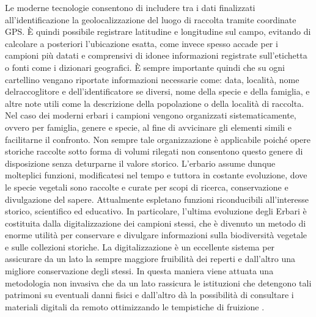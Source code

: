 \documentclass[main.tex]{subfiles}
\begin{document}
Le moderne tecnologie consentono di includere tra i dati finalizzati all’identificazione la geolocalizzazione del luogo di raccolta tramite coordinate GPS. È quindi possibile registrare latitudine e longitudine sul campo, evitando di calcolare a posteriori l’ubicazione esatta, come invece spesso accade per i campioni più datati e comprensivi di idonee informazioni registrate sull'etichetta o fonti come i dizionari geografici. È sempre importante quindi che su ogni cartellino vengano riportate informazioni necessarie come: data, località, nome delraccoglitore e dell’identificatore se diversi, nome della specie e della famiglia, e altre note utili come la descrizione della popolazione o della località di raccolta.
Nel caso dei moderni erbari i campioni vengono organizzati sistematicamente, ovvero per famiglia, genere e specie, al fine di avvicinare gli elementi simili e facilitarne il confronto. Non sempre tale organizzazione è applicabile poiché opere storiche raccolte sotto forma di volumi rilegati non consentono questo genere di disposizione senza deturparne il valore storico.
L’erbario assume dunque molteplici funzioni, modificatesi nel tempo e tuttora in costante evoluzione, dove le specie vegetali sono raccolte e curate per scopi di ricerca, conservazione e divulgazione del sapere. Attualmente espletano funzioni riconducibili all’interesse storico, scientifico ed educativo.
In particolare, l’ultima evoluzione degli Erbari è costituita dalla digitalizzazione dei campioni stessi, che è divenuto un metodo di enorme utilità per conservare e divulgare informazioni sulla biodiversità vegetale e sulle collezioni storiche. La digitalizzazione è un eccellente sistema per assicurare da un lato la sempre maggiore fruibilità dei reperti e dall’altro una migliore conservazione degli stessi. In questa maniera viene attuata una metodologia non invasiva che da un lato rassicura le istituzioni che detengono tali patrimoni su eventuali danni fisici e dall’altro dà la possibilità di consultare i materiali digitali da remoto ottimizzando le tempistiche di fruizione \citep{rad}.
\end{document}
